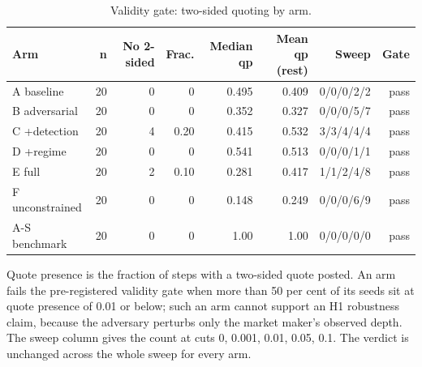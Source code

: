 \begin{table}[htbp]
  \centering
  \caption{Validity gate: two-sided quoting by arm.}
  \label{tab:validity}
  \begin{tabular}{lrrrrrrr}
    \toprule
    Arm & n & No 2-sided & Frac. & Median qp & Mean qp (rest) & Sweep & Gate \\
    \midrule
    A  baseline & 20 & 0 & 0 & 0.495 & 0.409 & 0/0/0/2/2 & pass \\
    B  adversarial & 20 & 0 & 0 & 0.352 & 0.327 & 0/0/0/5/7 & pass \\
    C  +detection & 20 & 4 & 0.20 & 0.415 & 0.532 & 3/3/4/4/4 & pass \\
    D  +regime & 20 & 0 & 0 & 0.541 & 0.513 & 0/0/0/1/1 & pass \\
    E  full & 20 & 2 & 0.10 & 0.281 & 0.417 & 1/1/2/4/8 & pass \\
    F  unconstrained & 20 & 0 & 0 & 0.148 & 0.249 & 0/0/0/6/9 & pass \\
    A-S benchmark & 20 & 0 & 0 & 1.00 & 1.00 & 0/0/0/0/0 & pass \\
    \bottomrule
  \end{tabular}
  \begin{minipage}{\linewidth}\vspace{4pt}\footnotesize Quote presence is the fraction of steps with a two-sided quote posted. An arm fails the pre-registered validity gate when more than 50 per cent of its seeds sit at quote presence of 0.01 or below; such an arm cannot support an H1 robustness claim, because the adversary perturbs only the market maker's observed depth. The sweep column gives the count at cuts 0, 0.001, 0.01, 0.05, 0.1. The verdict is unchanged across the whole sweep for every arm.\end{minipage}
\end{table}
